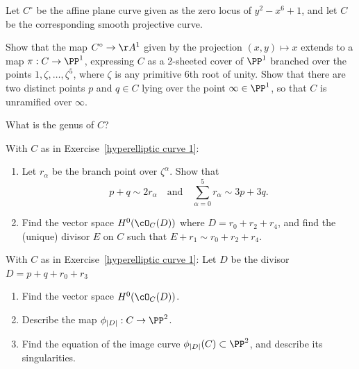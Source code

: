 \begin{exercise}\label{hyperelliptic curve 1}
Let $C^\circ$ be the affine plane curve given as the zero locus of $y^2 - x^6 +1$, and let $C$ be the corresponding smooth projective curve. 

Show  that the map $C^\circ \to \AA^1$ given by the projection $(x,y) \mapsto x$ extends to a map $\pi : C \to \PP^1$, expressing $C$ as a 2-sheeted cover of $\PP^1$ branched over the points $1, \zeta, \dots, \zeta^5$, where $\zeta$ is any primitive 6th root of unity. Show that there are two distinct points $p$ and $q \in C$  lying over the point $\infty \in \PP^1$,
so that $C$ is unramified over $\infty$.

What is the genus of $C$?
\end{exercise}

\begin{exercise} With $C$ as in Exercise~\ref{hyperelliptic curve 1}:
\begin{enumerate}

\item Let $r_\alpha$ be the branch point over $\zeta^\alpha$. Show that
$$
p+q \sim 2r_\alpha \quad \text{and} \quad \sum_{\alpha = 0}^5 r_\alpha \sim 3p+3q.
$$

\item Find the vector space $H^0(\cO_C(D))$ where $D = r_0 + r_2 + r_4$, and find the (unique) divisor $E$ on $C$ such that $E + r_1 \sim r_0 + r_2 + r_4$.

\end{enumerate}

\end{exercise}

\begin{exercise}
With $C$ as in Exercise~\ref{hyperelliptic curve 1}:
Let $D$ be the divisor $D = p + q + r_0 + r_3$
\begin{enumerate}
\item Find the vector space $H^0(\cO_C(D))$.
\item Describe the map $\phi_{|D|} : C \to \PP^2$.
\item Find the equation of the image curve $\phi_{|D|}(C) \subset \PP^2$, and describe its singularities.
\end{enumerate}
\end{exercise}
 
